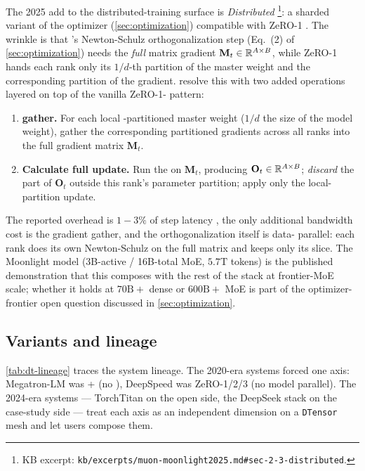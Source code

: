 The 2025 add to the distributed-training surface is \emph{Distributed
} \citep[\S 2.3]{muon-moonlight2025}\footnote{KB excerpt:
\nolinkurl{kb/excerpts/muon-moonlight2025.md#sec-2-3-distributed}.}: a
sharded variant of the  optimizer (\cref{sec:optimization})
compatible with ZeRO-1 . The wrinkle is that 's Newton-Schulz
orthogonalization step (Eq.~(2) of \cref{sec:optimization}) needs the
\emph{full} matrix gradient $\mathbf{M}_t \in \mathbb{R}^{A \times B}$, while
ZeRO-1 hands each rank only its
$1/d$-th partition of the master weight and the corresponding
partition of the gradient. \citet[\S 2.3]{muon-moonlight2025} resolve
this with two added operations layered on top of the vanilla
ZeRO-1- pattern:
\begin{enumerate}
\item \textbf{ gather.} For each local -partitioned master weight
($1/d$ the size of the model weight), gather the corresponding
partitioned gradients across all  ranks into the full gradient matrix
$\mathbf{M}_t$.
\item \textbf{Calculate full update.} Run the 
on $\mathbf{M}_t$, producing $\mathbf{O}_t \in \mathbb{R}^{A \times B}$;
\emph{discard} the part of $\mathbf{O}_t$ outside this rank's parameter
partition; apply only the local-partition update.
\end{enumerate}
The reported overhead is $1\!-\!3\%$ of step latency
\citep[\S 2.3]{muon-moonlight2025}, the only additional bandwidth cost
is the gradient gather, and the orthogonalization itself is data-
parallel: each rank does its own Newton-Schulz on the full matrix and
keeps only its slice. The Moonlight model (3B-active / 16B-total MoE,
$5.7\text{T}$ tokens) is the published demonstration that this
composes with the rest of the stack at frontier-MoE scale; whether it
holds at $70\text{B}{+}$ dense or $600\text{B}{+}$ MoE is part of the
optimizer-frontier open question discussed in \cref{sec:optimization}.

\subsection{Variants and lineage}
\label{sec:dt-lineage}

\cref{tab:dt-lineage} traces the system lineage. The 2020-era systems
forced one axis: Megatron-LM was + (no ), DeepSpeed was
ZeRO-1/2/3 (no model parallel). The 2024-era systems --- TorchTitan
\citep{torchtitan2024} on the open side, the DeepSeek stack
\citep{deepseek-v3} on the case-study side --- treat each axis as an
independent dimension on a \texttt{DTensor} mesh and let users compose
them.

